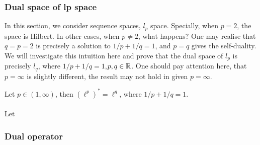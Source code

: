 \subsubsection{Dual space of lp space}\label{lp dual}
In this section, we consider sequence spaces, $l_p$ space. Specially, when $p=2$, the space is Hilbert. In other cases,  when $p\not=2$, what happens? One may realise that $q=p=2$ is precisely a solution to $1/p+1/q=1$, and $p=q$ gives the self-duality. We will investigate this intuition here and prove that the dual space of $l_p$ is precisely $l_q$, where $1/p+1/q=1$,$p,q\in\mathbb{R}$. One should pay attention here, that $p=\infty$ is slightly different, the result may not hold in given $p=\infty$.

\begin{theorem}\rm\nextline
	Let $p\in (1,\infty)$, then $(\ell^p)^*=\ell^q $, where $1/p+1/q=1$.\\
	\pf\\
	Let 
\end{theorem}


\subsubsection{Dual operator}\label{dual operator}
